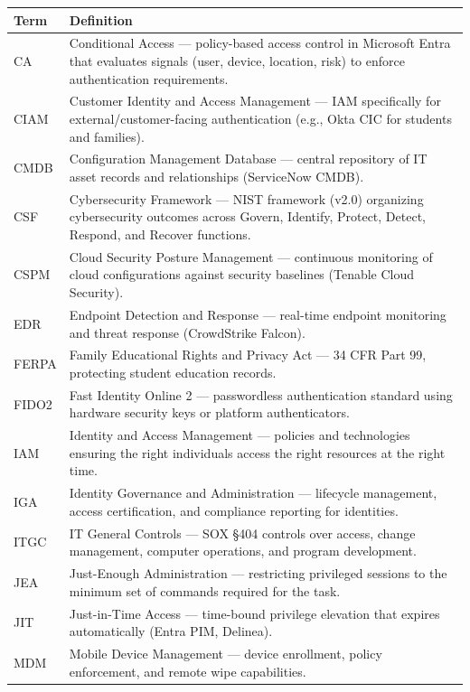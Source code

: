 \documentclass[11pt,landscape]{article}
\begin{document}
\begin{longtable}{lp{7in}}
\toprule
\textbf{Term} & \textbf{Definition} \\
\midrule
\endhead
CA & Conditional Access --- policy-based access control in Microsoft Entra that evaluates signals (user, device, location, risk) to enforce authentication requirements. \\
CIAM & Customer Identity and Access Management --- IAM specifically for external/customer-facing authentication (e.g., Okta CIC for students and families). \\
CMDB & Configuration Management Database --- central repository of IT asset records and relationships (ServiceNow CMDB). \\
CSF & Cybersecurity Framework --- NIST framework (v2.0) organizing cybersecurity outcomes across Govern, Identify, Protect, Detect, Respond, and Recover functions. \\
CSPM & Cloud Security Posture Management --- continuous monitoring of cloud configurations against security baselines (Tenable Cloud Security). \\
EDR & Endpoint Detection and Response --- real-time endpoint monitoring and threat response (CrowdStrike Falcon). \\
FERPA & Family Educational Rights and Privacy Act --- 34 CFR Part 99, protecting student education records. \\
FIDO2 & Fast Identity Online 2 --- passwordless authentication standard using hardware security keys or platform authenticators. \\
IAM & Identity and Access Management --- policies and technologies ensuring the right individuals access the right resources at the right time. \\
IGA & Identity Governance and Administration --- lifecycle management, access certification, and compliance reporting for identities. \\
ITGC & IT General Controls --- SOX \S 404 controls over access, change management, computer operations, and program development. \\
JEA & Just-Enough Administration --- restricting privileged sessions to the minimum set of commands required for the task. \\
JIT & Just-in-Time Access --- time-bound privilege elevation that expires automatically (Entra PIM, Delinea). \\
MDM & Mobile Device Management --- device enrollment, policy enforcement, and remote wipe capabilities. \\

\end{longtable}
\end{document}
